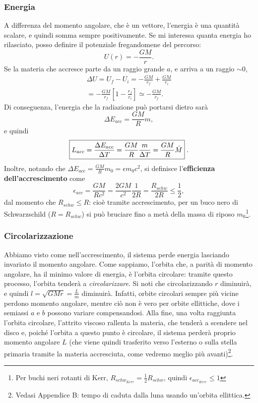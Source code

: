 \subsubsection{Energia}
A differenza del momento angolare, che è un vettore, l'energia è una quantità scalare, e quindi somma sempre positivamente.
Se mi interessa quanta energia ho rilasciato, posso definire il potenziale fregandomene del percorso:
\begin{equation}
    U(r) = -\frac{GM}{r}.
\end{equation}
Se la materia che accresce parte da un raggio grande $a$, e arriva a un raggio $\sim0$, 
\begin{align}
    \Delta U = U_f-U_i = -\frac{GM}{r_f} + \frac{GM}{r_i} \\
    = -\frac{GM}{r_f}[1 - \frac{r_f}{r_i}] \simeq -\frac{GM}{r_f}.
\end{align}
Di conseguenza, l'energia che la radiazione può portarsi dietro sarà
\begin{equation}
    \Delta E_{acc} = \frac{GM}{R}m,
\end{equation}
e quindi
\begin{equation}
    \boxed{L_{acc} = \frac{\Delta E_{acc}}{\Delta T} = \frac{GM}{R}\frac{m}{\Delta T} = \frac{GM}{R}\dot{M}}\hspace{1mm}.
\end{equation}
Inoltre, notando che $\Delta E_{acc} = \frac{GM}{R}m_0 =\epsilon m_0 c^2$, si definisce l'\textbf{efficienza dell'accrescimento} come
\begin{equation}
   \epsilon_{acc} = \frac{GM}{Rc^2} = \frac{2GM}{c^2}\frac{1}{2R} = \frac{R_{schw}}{2R} \le \frac{1}{2},
\end{equation}
dal momento che $R_{schw} \le R$: cioè tramite accrescimento, per un buco nero di Schwarzschild ($R=R_{schw}$) si può bruciare fino a metà della massa di riposo $m_0$\footnote{Per buchi neri rotanti di Kerr, $R_{schw_{Kerr}} = \frac{1}{2}R_{schw} $, quindi $\epsilon_{acc_{Kerr}}\le 1 $}.

\subsubsection{Circolarizzazione}
Abbiamo visto come nell'accrescimento, il sistema perde energia lasciando invariato il momento angolare. Come sappiamo, l'orbita che, a parità di momento angolare, ha il minimo valore di energia, è l'orbita circolare: tramite questo processo, l'orbita tenderà a \textit{circolarizzare}. 
Si noti che circolarizzando $r$ diminuirà, e quindi $l = \sqrt{GMr} =\frac{L}{m}$ diminuirà.
Infatti, orbite circolari sempre più vicine perdono momento angolare, mentre ciò non è vero per orbite ellittiche, dove i semiassi $a$ e $b$ possono variare compensandosi.
Alla fine, una volta raggiunta l'orbita circolare, l'attrito viscoso rallenta la materia, che tenderà a scendere nel disco e, poiché l'orbita a questo punto è circolare, il sistema perderà proprio momento angolare $L$ (che viene quindi trasferito verso l'esterno o sulla stella primaria tramite la materia accresciuta, come vedremo meglio più avanti)\footnote{Vedasi Appendice B: tempo di caduta dalla luna usando un'orbita ellittica.}.


